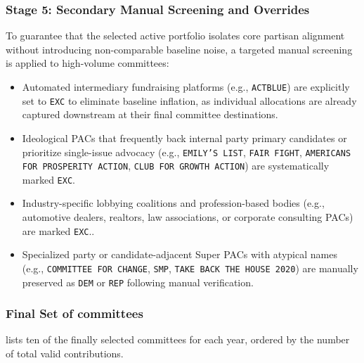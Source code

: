 \subsubsection{Stage 5: Secondary Manual Screening and Overrides}
To guarantee that the selected active portfolio isolates core partisan alignment without introducing non-comparable baseline noise, a targeted manual screening is applied to high-volume committees:
\begin{itemize}
    \item Automated intermediary fundraising platforms (e.g., \texttt{ACTBLUE}) are explicitly set to \texttt{EXC} to eliminate baseline inflation, as individual allocations are already captured downstream at their final committee destinations.
    \item Ideological PACs that frequently back internal party primary candidates or prioritize single-issue advocacy (e.g., \texttt{EMILY'S LIST}, \texttt{FAIR FIGHT}, \texttt{AMERICANS FOR PROSPERITY ACTION}, \texttt{CLUB FOR GROWTH ACTION}) are systematically marked \texttt{EXC}.
    \item Industry-specific lobbying coalitions and profession-based bodies (e.g., automotive dealers, realtors, law associations, or corporate consulting PACs) are marked \texttt{EXC}..
    \item Specialized party or candidate-adjacent Super PACs with atypical names (e.g., \texttt{COMMITTEE FOR CHANGE}, \texttt{SMP}, \texttt{TAKE BACK THE HOUSE 2020}) are manually preserved as \texttt{DEM} or \texttt{REP} following manual verification.
\end{itemize}

\subsubsection{Final Set of committees}
 lists ten of the finally selected committees for each year, ordered by the number of total valid contributions. 



